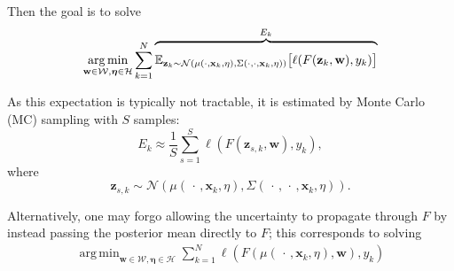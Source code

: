 \documentclass{article}
\DeclareMathOperator*{\argmin}{arg\,min}
\begin{document}
Then the goal is to solve
\begin{equation}\label{eq:gp-mc}
\argmin_{\mathbf{w} \in \mathcal{W},\bm{\eta} \in \mathcal{H}} \sum_{k=1}^N \overbrace{\rule{0pt}{0.5cm} \mathbb{E}_{\mathbf{z}_k \sim \mathcal{N}\left( \mu(\cdot, \mathbf{x}_k, \eta), \Sigma(\cdot, \cdot, \mathbf{x}_k, \eta)\right) } \big[ \ell(F(\mathbf{z}_k, \mathbf{w}), y_k) \big] }^{\text{$E_k$}} 
\end{equation}

As this expectation is typically not tractable, it is estimated by Monte Carlo (MC) sampling with $S$ samples:
\begin{equation*}
E_k \approx \frac{1}{S} \sum_{s=1}^{S} \ell(F(\mathbf{z}_{s, k}, \mathbf{w}), y_k),
\end{equation*}
where
\begin{equation*}
    \mathbf{z}_{s, k} \sim \mathcal{N}\left( \mu(\,\cdot\,, \mathbf{x}_k, \eta), \Sigma(\,\cdot\,, \,\cdot\,, \mathbf{x}_k, \eta)\right).
\end{equation*}

Alternatively, one may forgo allowing the uncertainty to propagate through $F$ by instead passing the posterior mean directly to $F$; this corresponds to solving
\begin{align}\label{eq:gp-mean}
\argmin_{\mathbf{w} \in \mathcal{W},\bm{\eta} \in \mathcal{H}} \sum_{k=1}^N \ell(F(\mu(\,\cdot\,,\mathbf{x}_k, \eta), \mathbf{w}), y_k)
\end{align}
\end{document}
